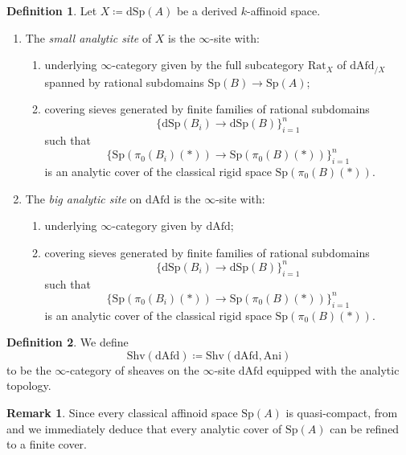 \documentclass[oneside, hidelinks, 12pt, a4paper,reqno]{amsart}
\theoremstyle{plain}
\theoremstyle{definition}
\newtheorem{definition}[definition]{Definition}
\newtheorem{remark}[remark]{Remark}
\theoremstyle{plain}
\newcommand{\Sp}{\mathrm{Sp}}
\newcommand{\dSp}{\mathrm{dSp}}
\begin{document}
\begin{definition}\cite[Definition 4.12]{soor2025sixfunctorformalismquasicoherentsheaves}\label{def: weak analytic site}
Let $X \coloneqq \dSp(A)$ be a derived $k$-affinoid space.
\begin{enumerate}
    \item[(i)] The \emph{small analytic site} of $X$ is the $\infty$-site with:
    \begin{enumerate}
        \item[(a)] underlying $\infty$-category given by the full subcategory $\mathrm{Rat}_X$ of $\mathrm{dAfd}_{/X}$ spanned by rational subdomains $\Sp(B) \to \Sp(A)$;
        \item[(b)] covering sieves generated by finite families of rational subdomains 
        \[
        \{\dSp(B_i) \to \dSp(B)\}_{i=1}^n
        \]
        such that 
        \[
        \{\Sp(\pi_0(B_i)(\ast)) \to \Sp(\pi_0(B)(\ast))\}_{i=1}^n
        \]
        is an analytic cover of the classical rigid space $\Sp(\pi_0(B)(\ast))$.
    \end{enumerate}
    
    \item[(ii)] The \emph{big analytic site} on $\mathrm{dAfd}$ is the $\infty$-site with:
    \begin{enumerate}
        \item[(a)] underlying $\infty$-category given by $\mathrm{dAfd}$;
        \item[(b)] covering sieves generated by finite families of rational subdomains 
        \[
        \{\dSp(B_i) \to \dSp(B)\}_{i=1}^n
        \]
         such that 
         \[
        \{\Sp(\pi_0(B_i)(\ast)) \to \Sp(\pi_0(B)(\ast))\}_{i=1}^n 
         \]
        is an analytic cover of the classical rigid space $\Sp(\pi_0(B)(\ast))$.
    \end{enumerate}
\end{enumerate}
\end{definition}

\begin{definition}
We define
\begin{equation}
    \mathrm{Shv}(\mathrm{dAfd}) \coloneqq \mathrm{Shv}(\mathrm{dAfd}, \mathrm{Ani})
\end{equation}
to be the $\infty$-category of sheaves on the $\infty$-site $\mathrm{dAfd}$ equipped with the analytic topology.
\end{definition}

\begin{remark}\label{rmk: finite cover}
    Since every classical affinoid space $\Sp(A)$ is quasi-compact, from  and  we immediately deduce that every analytic cover of $\Sp(A)$ can be refined to a finite cover. 
\end{remark}
\end{document}
